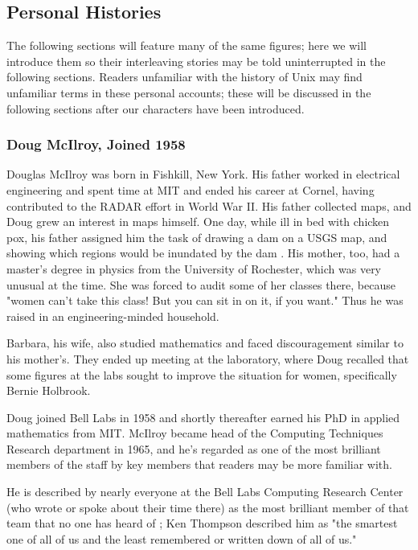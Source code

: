 
\subsection{Personal Histories}

The following sections will feature many of the same figures;
here we will introduce them so their interleaving stories may be told
uninterrupted in the following sections.
Readers unfamiliar with the history of Unix may find unfamiliar terms in these
personal accounts; these will be discussed in the following sections after
our characters have been introduced.

\subsubsection{Doug McIlroy, Joined 1958}

Douglas McIlroy was born in Fishkill, New York.
His father worked in electrical engineering and spent time at
MIT and ended his career at Cornel, having contributed to the RADAR effort in World War II.
His father collected maps, and Doug grew an interest in maps himself.
One day, while ill in bed with chicken pox, his father assigned him the task of drawing
a dam on a USGS map, and showing which regions would be inundated by the dam
\cite{doug_mcilroy_oral_history_2019}.
His mother, too, had a master's degree in physics from the University of Rochester,
which was very unusual at the time. She was forced to audit some of her classes there,
because "women can't take this class! But you can sit in on it, if you want."
Thus he was raised in an engineering-minded household.

Barbara, his wife, also studied mathematics and faced discouragement similar to his mother's.
They ended up meeting at the laboratory, where Doug recalled that some figures at the labs sought
to improve the situation for women, specifically Bernie Holbrook.

Doug joined Bell Labs in 1958 and shortly thereafter earned his
PhD in applied mathematics from MIT.
McIlroy became head of the Computing Techniques Research department in 1965, and he's regarded
as one of the most brilliant members of the staff by key members that readers may be more familiar with.

He is described by nearly everyone at the Bell Labs Computing Research Center
(who wrote or spoke about their time there)
as the most brilliant member of that team that no one has heard of
\cite{kernighan_interviews_thompson_2019}; Ken Thompson described him as
"the smartest one of all of us and the least remembered or written down of all of us."

